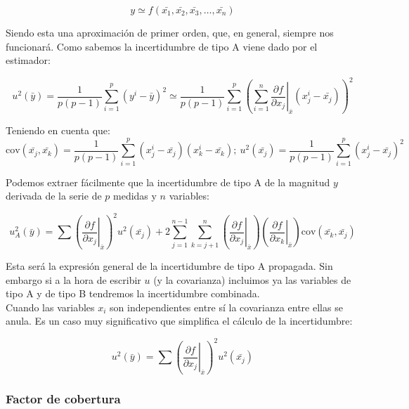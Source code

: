\documentclass[12pt,a4paper]{book}
\newcommand{\cov}{\mathrm{cov}}
\newcommand{\parentesis}[1]{\left( #1 \right)}
\newcommand{\parciales}[2]{\frac{\partial #1}{\partial #2}}
\begin{document}
\begin{equation}
y \simeq f(\bar{x_1}, \bar{x_2}, \bar{x_3}, \ldots, \bar{x_n})
\end{equation}

Siendo esta una aproximación de primer orden, que, en general, siempre nos funcionará. Como sabemos la incertidumbre de tipo A viene dado por el estimador:

\begin{equation}
u^2(\bar{y}) = \dfrac{1}{p (p-1)} \sum_{i=1}^p (y^i - \bar{y})^2 \simeq \dfrac{1}{p (p-1)} \sum_{i=1}^p \left( \sum_{i=1}^n \left. \parciales{f}{x_j} \right|_{\bar{x}} (x_j^i - \bar{x_j})  \right)^2
\end{equation}


Teniendo en cuenta que:
 $$\cov (\bar{x_j}, \bar{x_k}) = \dfrac{1}{p (p-1)} \sum_{i=1}^p (x_j^i - \bar{x_j})(x_k^i - \bar{x_k}); \ u^2 (\bar{x_j}) = \dfrac{1}{p (p-1)} \sum_{i=1}^p (x_j^i - \bar{x_j})^2 $$
 
Podemos extraer fácilmente que la incertidumbre de tipo A de la magnitud $y$ derivada de la serie de $p$ medidas y $n$ variables: 

\begin{equation}
u_A^2 (\bar{y}) = \sum \parentesis{ \left. \parciales{f}{x_j} \right|_{\bar{x}} }^2 u^2(\bar{x_j}) + 2 \sum_{j=1}^{n-1} \sum_{k = j+1}^n \parentesis{ \left. \parciales{f}{x_j} \right|_{\bar{x}} }  \parentesis{ \left. \parciales{f}{x_k} \right|_{\bar{x}} } \cov(\bar{x_k}, \bar{x_j})
\end{equation}

Esta será la expresión general de la incertidumbre de tipo A propagada. Sin embargo si a la hora de escribir $u$ (y la covarianza) incluimos ya las variables de tipo A y de tipo B tendremos la incertidumbre combinada. \\

Cuando las variables $x_i$ son independientes entre sí la covarianza entre ellas se anula. Es un caso muy significativo que simplifica el cálculo de la incertidumbre:

\begin{equation}
u^2 (\bar{y}) = \sum \parentesis{ \left. \parciales{f}{x_j} \right|_{\bar{x}} }^2 u^2(\bar{x_j})
\end{equation}

\subsubsection{Factor de cobertura}
\end{document}
